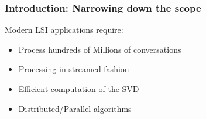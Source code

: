 	\begin{frame}[plain]
	 	\frametitle{Introduction: Narrowing down the scope}
		\begin{block}{}
      Modern LSI applications require:
      \begin{itemize}
        \item Process hundreds of Millions of conversations
        \item Processing in streamed fashion
        \item Efficient computation of the SVD
        \item Distributed/Parallel algorithms
      \end{itemize}
		\end{block} 
	\end{frame}
